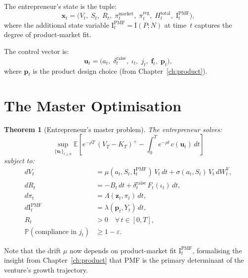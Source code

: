\documentclass[12pt,a4paper,oneside]{book}
\newtheorem{theorem}{Theorem}[chapter]
\theoremstyle{definition}
\theoremstyle{remark}
\newcommand{\E}{\mathbb{E}}
\newcommand{\Prob}{\mathbb{P}}
\newcommand{\MI}{\mathrm{I}}
\begin{document}
The entrepreneur's state is the tuple:
\begin{equation}\label{eq:state}
  \mathbf{x}_t = \bigl(V_t,\; S_t,\; R_t,\;
    \pi_t^{\text{market}},\; \pi_t^{\text{reg}},\;
    H_t^{\text{total}},\; \MI_t^{\text{PMF}}\bigr),
\end{equation}
where the additional state variable $\MI_t^{\text{PMF}} = \MI(P; N)$ at time~$t$
captures the degree of product-market fit.

The control vector is:
\begin{equation}\label{eq:controls}
  \mathbf{u}_t = \bigl(a_t,\; \delta_t^{\text{raise}},\;
    \iota_t,\; j_t,\; \mathbf{f}_t,\; \mathbf{p}_t\bigr),
\end{equation}
where $\mathbf{p}_t$ is the product design choice (from Chapter~\ref{ch:product}).

\section{The Master Optimisation}

\begin{theorem}[Entrepreneur's master problem]\label{thm:master}
The entrepreneur solves:
\begin{equation}\label{eq:master}
  \sup_{\{\mathbf{u}_t\}_{t \geq 0}} \E\left[
    e^{-\rho T}\,(V_T - K_T)^+
    - \int_0^T e^{-\rho t}\,c(\mathbf{u}_t)\,dt
  \right]
\end{equation}
subject to:
\begin{align}
  dV_t &= \mu(a_t, S_t, \MI_t^{\text{PMF}})\,V_t\,dt
    + \sigma(a_t, S_t)\,V_t\,dW_t^V,
    \label{eq:master_V} \\
  dR_t &= -B_t\,dt + \delta_t^{\text{raise}}\,F_t(\iota_t)\,dt,
    \label{eq:master_R} \\
  d\pi_t &= \Lambda(\mathbf{z}_t, \pi_t)\,dt,
    \label{eq:master_pi} \\
  d\MI_t^{\text{PMF}} &= \lambda(\mathbf{p}_t, Y_t)\,dt,
    \label{eq:master_pmf} \\
  R_t &> 0 \quad \forall\, t \in [0,T],
    \label{eq:master_runway} \\
  \Prob(\text{compliance in } j_t) &\geq 1 - \varepsilon.
    \label{eq:master_compliance}
\end{align}
\end{theorem}

Note that the drift $\mu$ now depends on product-market fit $\MI_t^{\text{PMF}}$,
formalising the insight from Chapter~\ref{ch:product} that PMF is the primary
determinant of the venture's growth trajectory.
\end{document}
